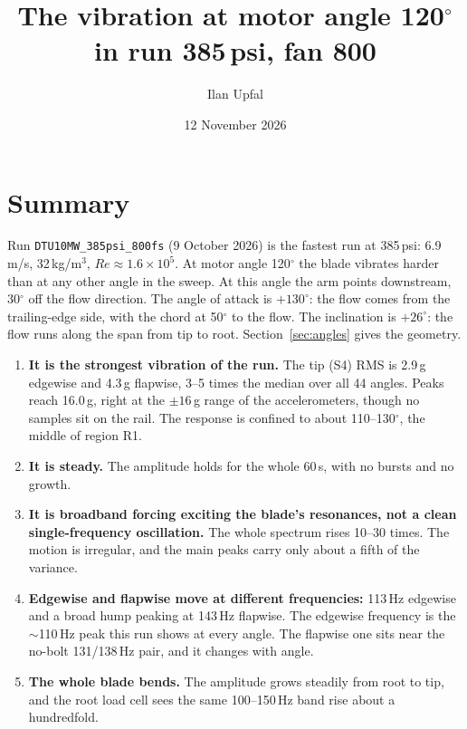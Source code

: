 \documentclass[11pt]{article}
\title{The vibration at motor angle 120$^\circ$ in run 385\,psi, fan 800}
\author{Ilan Upfal}
\date{12 November 2026}
\newcommand{\code}[1]{\texttt{#1}}
\begin{document}
\maketitle

\section*{Summary}

Run \code{DTU10MW\_385psi\_800fs} (9 October 2026) is the fastest run at
385\,psi: 6.9\,m/s, 32\,kg/m$^3$, $Re \approx 1.6\times10^5$. At motor angle
120$^\circ$ the blade vibrates harder than at any other angle in the sweep.
At this angle the arm points downstream, 30$^\circ$ off the flow direction.
The angle of attack is $+130^\circ$: the flow comes from the trailing-edge
side, with the chord at 50$^\circ$ to the flow. The inclination is
$+26^\circ$: the flow runs along the span from tip to root.
Section~\ref{sec:angles} gives the geometry.

\begin{enumerate}
  \item \textbf{It is the strongest vibration of the run.} The tip (S4) RMS
        is 2.9\,g edgewise and 4.3\,g flapwise, 3--5 times the median over all
        44 angles. Peaks reach 16.0\,g, right at the $\pm16$\,g range of the
        accelerometers, though no samples sit on the rail. The response is
        confined to about 110--130$^\circ$, the middle of region R1.
  \item \textbf{It is steady.} The amplitude holds for the whole 60\,s, with
        no bursts and no growth.
  \item \textbf{It is broadband forcing exciting the blade's resonances, not a
        clean single-frequency oscillation.} The whole spectrum rises 10--30
        times. The motion is irregular, and the main peaks carry only about a
        fifth of the variance.
  \item \textbf{Edgewise and flapwise move at different frequencies:}
        113\,Hz edgewise and a broad hump peaking at 143\,Hz flapwise. The
        edgewise frequency is the $\sim$110\,Hz peak this run shows at every
        angle. The flapwise one sits near the no-bolt 131/138\,Hz pair, and
        it changes with angle.
  \item \textbf{The whole blade bends.} The amplitude grows steadily from root
        to tip, and the root load cell sees the same 100--150\,Hz band
        rise about a hundredfold.
\end{enumerate}
\end{document}
